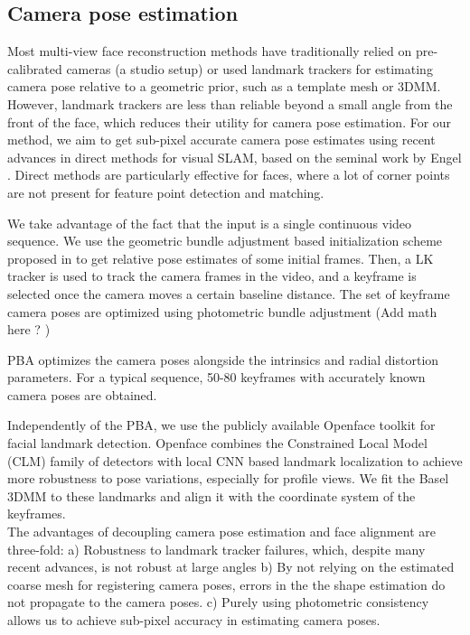 \documentclass[10pt,twocolumn,letterpaper]{article}
\begin{document}
\subsection{Camera pose estimation} \label{sec:PBA}
Most multi-view face reconstruction methods have traditionally relied on pre-calibrated cameras (a studio setup) or used landmark trackers for estimating camera pose relative to a geometric prior, such as a template mesh or 3DMM. However, landmark trackers are less than reliable beyond a small angle from the front of the face, which reduces their utility for camera pose estimation. For our method, we aim to get sub-pixel accurate camera pose estimates using recent advances in direct methods for visual SLAM, based on the seminal work by Engel \etal \cite{engel2018direct,engel2014lsd}. Direct methods are particularly effective for faces, where a lot of corner points are not present for feature point detection and matching.

We take advantage of the fact that the input is a single continuous video sequence. We use the geometric bundle adjustment based initialization scheme proposed in \cite{ham2017monocular} to get relative pose estimates of some initial frames. Then, a LK tracker is used to track the camera frames in the video, and a keyframe is selected once the camera moves a certain baseline distance. The set of keyframe camera poses are optimized using photometric bundle adjustment (Add math here ? ) 


PBA optimizes the camera poses alongside the intrinsics and radial distortion parameters. For a typical sequence, 50-80 keyframes with accurately known camera poses are obtained.


Independently of the PBA, we use the publicly available Openface toolkit \cite{baltrusaitis2018openface} for facial landmark detection. Openface combines the Constrained Local Model (CLM) family of detectors with local CNN based landmark localization to achieve more robustness to pose variations, especially for profile views. We fit the Basel 3DMM \cite{blanz1999morphable} to these landmarks and align it with the coordinate system of the keyframes.\\

The advantages of decoupling camera pose estimation and face alignment are three-fold: a) Robustness to landmark tracker failures, which, despite many recent advances, is not robust at large angles  b) By not relying on the estimated coarse mesh for registering camera poses, errors in the the shape estimation do not propagate to the camera poses. c) Purely using photometric consistency allows us to achieve sub-pixel accuracy in estimating camera poses. 
\end{document}
